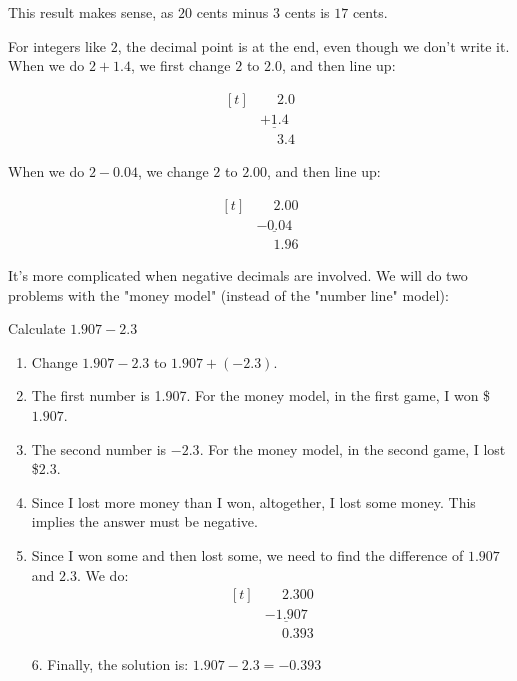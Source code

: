 This result makes sense, as $20$ cents minus $3$ cents is $17$ cents.

For integers like $2$, the decimal point is at the end, even though we don't write it. When we do $2+1.4$, we first change $2$ to $2.0$, and then line up:

\[
\begin{aligned}[t] 
	&\phantom{+}2.0 \\
	&\underline{+1.4} \\
	&\phantom{+}3.4
\end{aligned}
\]

When we do $2-0.04$, we change $2$ to $2.00$, and then line up:

\[
\begin{aligned}[t] 
	&\phantom{-}2.00 \\
	&\underline{-0.04} \\
	&\phantom{-}1.96
\end{aligned}
\]

It's more complicated when negative decimals are involved. We will do two problems with the "money model" (instead of the "number line" model):

\begin{myexample}
Calculate $1.907-2.3$
\end{myexample}
\begin{solution}
\begin{enumerate}
\item Change $1.907-2.3$ to $1.907+(-2.3)$.
\item The first number is 1.907. For the money model, in the first game, I won \$$1.907$.
\item The second number is $-2.3$. For the money model, in the second game, I lost \$$2.3$.
\item Since I lost more money than I won, altogether, I lost some money. This implies the answer must be negative.
\item Since I won some and then lost some, we need to find the difference of $1.907$ and $2.3$. We do:
\[
\begin{aligned}[t] 
	&\phantom{-}2.300 \\
	&\underline{-1.907} \\
	&\phantom{-}0.393
\end{aligned}
\]
\item[6.] Finally, the solution is: $1.907-2.3=-0.393$
\end{enumerate}
\end{solution}

